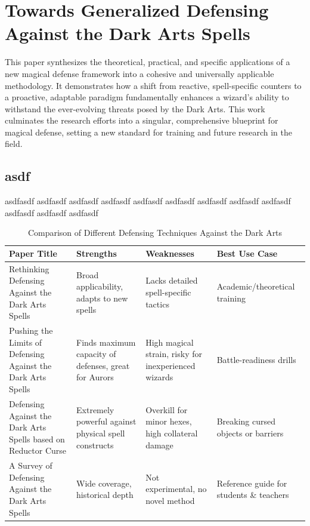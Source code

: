 \chapter{Towards Generalized Defensing Against the Dark Arts Spells}

This paper synthesizes the theoretical, practical, and specific applications of a new magical defense framework into a cohesive and universally applicable methodology. It demonstrates how a shift from reactive, spell-specific counters to a proactive, adaptable paradigm fundamentally enhances a wizard's ability to withstand the ever-evolving threats posed by the Dark Arts. This work culminates the research efforts into a singular, comprehensive blueprint for magical defense, setting a new standard for training and future research in the field.~\cite{gendart2025magic}

\section{asdf}
asdfasdf asdfasdf asdfasdf asdfasdf asdfasdf asdfasdf asdfasdf asdfasdf asdfasdf asdfasdf asdfasdf asdfasdf

\begin{table}[htbp]
\centering
\caption{Comparison of Different Defensing Techniques Against the Dark Arts}
\label{tab:defense_comparison1}
\begin{tabularx}{\textwidth}{p{2cm} X X X}
\hline
\textbf{Paper Title} & \textbf{Strengths} & \textbf{Weaknesses} & \textbf{Best Use Case} \\
\hline
Rethinking Defensing Against the Dark Arts Spells & Broad applicability, adapts to new spells & Lacks detailed spell-specific tactics & Academic/theoretical training \\
\hline
Pushing the Limits of Defensing Against the Dark Arts Spells & Finds maximum capacity of defenses, great for Aurors & High magical strain, risky for inexperienced wizards & Battle-readiness drills \\
\hline
Defensing Against the Dark Arts Spells based on Reductor Curse & Extremely powerful against physical spell constructs & Overkill for minor hexes, high collateral damage & Breaking cursed objects or barriers \\
\hline
A Survey of Defensing Against the Dark Arts Spells & Wide coverage, historical depth & Not experimental, no novel method & Reference guide for students \& teachers \\
\hline
\end{tabularx}
\end{table}



